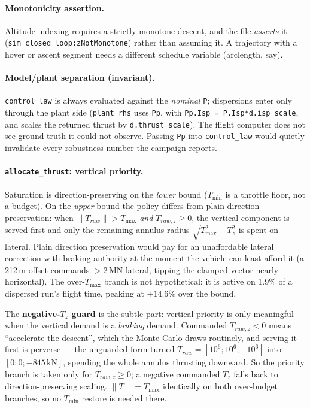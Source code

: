 \documentclass[11pt]{article}
\newcommand{\Tmin}{T_{\min}}
\newcommand{\Tmax}{T_{\max}}
\begin{document}
\paragraph{Monotonicity assertion.} Altitude indexing requires a strictly
monotone descent, and the file \emph{asserts} it
(\texttt{sim\_closed\_loop:zNotMonotone}) rather than assuming it. A
trajectory with a hover or ascent segment needs a different schedule
variable (arclength, say).

\paragraph{Model/plant separation (invariant).} \texttt{control\_law} is
always evaluated against the \emph{nominal} \texttt{P}; dispersions enter
only through the plant side (\texttt{plant\_rhs} uses \texttt{Pp}, with
\texttt{Pp.Isp = P.Isp*d.isp\_scale}, and scales the returned thrust by
\texttt{d.thrust\_scale}). The flight computer does not see ground truth it
could not observe. Passing \texttt{Pp} into \texttt{control\_law} would
quietly invalidate every robustness number the campaign reports.

\paragraph{\texttt{allocate\_thrust}: vertical priority.} Saturation is
direction-preserving on the \emph{lower} bound ($\Tmin$ is a throttle floor,
not a budget). On the \emph{upper} bound the policy differs from plain
direction preservation: when $\lVert T_{raw}\rVert > \Tmax$ \emph{and}
$T_{raw,z} \ge 0$, the vertical component is served first and only the
remaining annulus radius $\sqrt{\Tmax^2 - T_z^2}$ is spent on lateral. Plain
direction preservation would pay for an unaffordable lateral correction with
braking authority at the moment the vehicle can least afford it (a 212\,m
offset commands $>2$\,MN lateral, tipping the clamped vector nearly
horizontal). The over-$\Tmax$ branch is not hypothetical: it is active on
1.9\% of a dispersed run's flight time, peaking at $+14.6\%$ over the bound.

The \textbf{negative-$T_z$ guard} is the subtle part: vertical priority is
only meaningful when the vertical demand is a \emph{braking} demand.
Commanded $T_{raw,z} < 0$ means ``accelerate the descent'', which the Monte
Carlo draws routinely, and serving it first is perverse --- the unguarded
form turned $T_{raw} = [10^6;10^6;-10^6]$ into $[0;0;-845\,\text{kN}]$,
spending the whole annulus thrusting downward. So the priority branch is
taken only for $T_{raw,z} \ge 0$; a negative commanded $T_z$ falls back to
direction-preserving scaling. $\lVert T\rVert = \Tmax$ identically on both
over-budget branches, so no $\Tmin$ restore is needed there.
\end{document}
